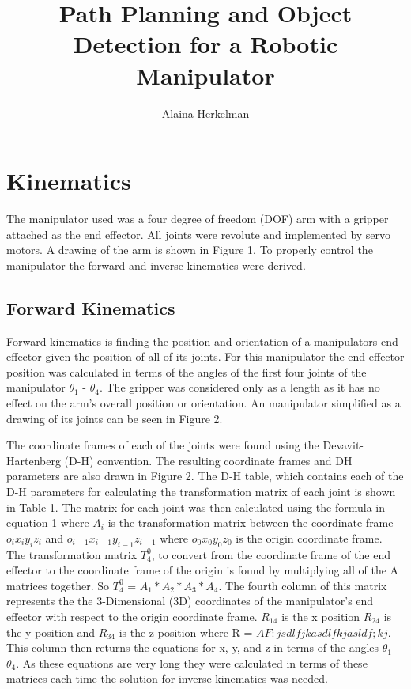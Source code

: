 \documentclass[letterpaper,12pt]{report}
\begin{document}
\title{Path Planning and Object Detection for a Robotic Manipulator}
\author{Alaina Herkelman}
\maketitle

\tableofcontents
\chapter{Kinematics}
The manipulator used was a four degree of freedom (DOF) arm with a gripper attached as the end effector. All joints were revolute and implemented by servo motors. A drawing of the arm is shown in Figure 1. To properly control the manipulator the forward and inverse kinematics were derived.

\section{Forward Kinematics}
Forward kinematics is finding the position and orientation of a manipulators end effector given the position of all of its joints. For this manipulator the end effector position was calculated in terms of the angles of the first four joints of the manipulator $\theta_1$ - $\theta_4$. The gripper was considered only as a length as it has no effect on the arm's overall position or orientation. An manipulator simplified as a drawing of its joints can be seen in Figure 2.

The coordinate frames of each of the joints were found using the Devavit-Hartenberg (D-H) convention. The resulting coordinate frames and DH parameters are also drawn in Figure 2. The D-H table, which contains each of the D-H parameters for calculating the transformation matrix of each joint is shown in Table 1. The matrix for each joint was then calculated using the formula in equation 1 where $A_i$ is the transformation matrix between the coordinate frame $o_ix_iy_iz_i$ and $o_{i-1}x_{i-1}y_{i-1}z_{i-1}$ where $o_0x_0y_0z_0$ is the origin coordinate frame. The transformation matrix $T_4^0$, to convert from the coordinate frame of the end effector to the coordinate frame of the origin is found by multiplying all of the A matrices together. So $T_4^0$ = $A_1*A_2*A_3*A_4$. The fourth column of this matrix represents the the 3-Dimensional (3D) coordinates of the manipulator's end effector with respect to the origin coordinate frame. $R_{14}$ is the x position $R_{24}$ is the y position and $R_{34}$ is the z position where R = $AF:jsdlfjkasdlfkjasldf;kj$. This column then returns the equations for x, y, and z in terms of the angles $\theta_1$ - $\theta_4$. As these equations are very long they were calculated in terms of these matrices each time the solution for inverse kinematics was needed.
\end{document}
